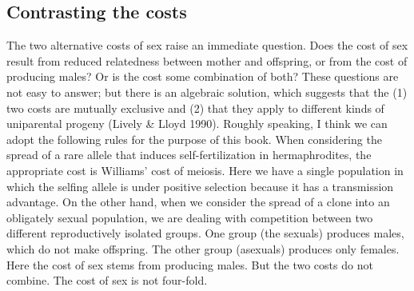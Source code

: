 \documentclass[
  letterpaper,
]{book}
\begin{document}
\subsection{Contrasting the costs}\label{contrasting-the-costs}

The two alternative costs of sex raise an immediate question. Does the
cost of sex result from reduced relatedness between mother and
offspring, or from the cost of producing males? Or is the cost some
combination of both? These questions are not easy to answer; but there
is an algebraic solution, which suggests that the (1) two costs are
mutually exclusive and (2) that they apply to different kinds of
uniparental progeny (Lively \& Lloyd 1990). Roughly speaking, I think we
can adopt the following rules for the purpose of this book. When
considering the spread of a rare allele that induces self-fertilization
in hermaphrodites, the appropriate cost is Williams' cost of meiosis.
Here we have a single population in which the selfing allele is under
positive selection because it has a transmission advantage. On the other
hand, when we consider the spread of a clone into an obligately sexual
population, we are dealing with competition between two different
reproductively isolated groups. One group (the sexuals) produces males,
which do not make offspring. The other group (asexuals) produces only
females. Here the cost of sex stems from producing males. But the two
costs do not combine. The cost of sex is not four-fold.
\end{document}
